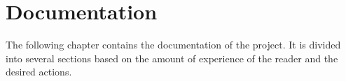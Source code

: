 \chapter{Documentation}

The following chapter contains the documentation of the project. 
It is divided into several sections based on the amount of experience of the reader and the desired actions.

